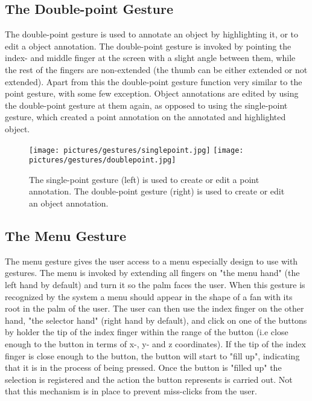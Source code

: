 \subsection{The Double-point Gesture}
The double-point gesture is used to annotate an object by highlighting it, or to edit a object annotation. The double-point gesture is invoked by pointing the index- and
middle finger at the screen with a slight angle between them, while the rest of the fingers are non-extended (the thumb can be either extended or not extended).
Apart from this the double-point gesture function very similar to the point gesture, with some few exception. Object annotations are edited by using the 
double-point gesture at them again, as opposed to using the single-point gesture, which created a point annotation on the annotated and highlighted object.

\begin{figure}%
	\texttt{[image: pictures/gestures/singlepoint.jpg]}
    \texttt{[image: pictures/gestures/doublepoint.jpg]}
	\caption[The single-point and double-point gestures]{The single-point gesture (left) is used to create or edit a point annotation. 
             The double-point gesture (right) is used to create or edit an object annotation.}
	\label{fig:gestures3}
\end{figure} 

\subsection{The Menu Gesture}
The menu gesture gives the user access to a menu especially design to use with gestures. The menu is invoked by extending all fingers on 
"the menu hand" (the left hand by default) and turn it so the palm faces the user. When this gesture is recognized by the system a menu should 
appear in the shape of a fan with its root in the palm of the user. The user can then use the index finger on the other hand, "the selector hand" (right hand by default),
and click on one of the buttons by holder the tip of the index finger within the range of the button (i.e close enough to the button in terms of x-, y- and z coordinates).
If the tip of the index finger is close enough to the button, the button will start to "fill up", indicating that it is in the process of being pressed.
Once the button is "filled up" the selection is registered and the action the button represents is carried out. Not that this mechanism is in place
to prevent miss-clicks from the user.
